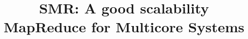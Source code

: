 \documentclass[preprint,10pt]{sigplanconf}
\title{\vspace{-5pt} SMR: A good scalability MapReduce for Multicore Systems\\
  
	\vspace{-5pt}}
\begin{document}
\maketitle


%








\begin{small}


%
\end{small}
\end{document}
